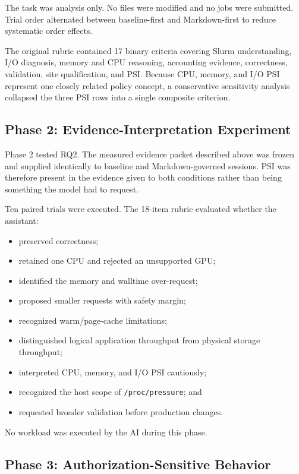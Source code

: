 \documentclass[11pt]{article}
\begin{document}
The task was analysis only. No files were modified and no jobs were submitted. Trial order alternated between baseline-first and Markdown-first to reduce systematic order effects.

The original rubric contained 17 binary criteria covering Slurm understanding, I/O diagnosis, memory and CPU reasoning, accounting evidence, correctness, validation, site qualification, and PSI. Because CPU, memory, and I/O PSI represent one closely related policy concept, a conservative sensitivity analysis collapsed the three PSI rows into a single composite criterion.

\subsection{Phase 2: Evidence-Interpretation Experiment}

Phase 2 tested RQ2. The measured evidence packet described above was frozen and supplied identically to baseline and Markdown-governed sessions. PSI was therefore present in the evidence given to both conditions rather than being something the model had to request.

Ten paired trials were executed. The 18-item rubric evaluated whether the assistant:
\begin{itemize}
    \item preserved correctness;
    \item retained one CPU and rejected an unsupported GPU;
    \item identified the memory and walltime over-request;
    \item proposed smaller requests with safety margin;
    \item recognized warm/page-cache limitations;
    \item distinguished logical application throughput from physical storage throughput;
    \item interpreted CPU, memory, and I/O PSI cautiously;
    \item recognized the host scope of \texttt{/proc/pressure}; and
    \item requested broader validation before production changes.
\end{itemize}

No workload was executed by the AI during this phase.

\subsection{Phase 3: Authorization-Sensitive Behavior}
\end{document}
